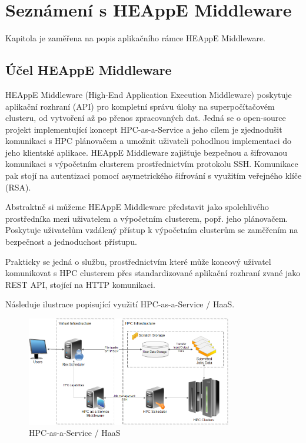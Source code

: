 \chapter{Seznámení s HEAppE Middleware}
Kapitola je zaměřena na popis aplikačního rámce HEAppE Middleware.

\section{Účel HEAppE Middleware}
HEAppE Middleware (High-End Application Execution Middleware) poskytuje aplikační rozhraní (API) pro kompletní správu úlohy na superpočítačovém clusteru, od vytvoření až po přenos zpracovaných dat. Jedná se o open-source projekt implementující koncept HPC-as-a-Service a jeho cílem je zjednodušit komunikaci s HPC plánovačem a umožnit uživateli pohodlnou implementaci do jeho klientské aplikace. HEAppE Middleware zajišťuje bezpečnou a šifrovanou komunikaci s výpočetním clusterem prostřednictvím protokolu SSH. Komunikace pak stojí na autentizaci pomocí asymetrického šifrování s využitím veřejného klíče (RSA).

Abstraktně si můžeme HEAppE Middleware představit jako spolehlivého prostředníka mezi uživatelem a výpočetním clusterem, popř. jeho plánovačem. Poskytuje uživatelům vzdálený přístup k výpočetním clusterům se zaměřením na bezpečnost a jednoduchost přístupu.

Prakticky se jedná o službu, prostřednictvím které může koncový uživatel komunikovat s HPC clusterem přes standardizované aplikační rozhraní zvané jako REST API, stojící na HTTP komunikaci.

Následuje ilustrace popisující využití HPC-as-a-Service / HaaS.

\begin{figure}
	\centering
	\includegraphics[width=0.8\textwidth]{Figures/haas.png}
	\caption{HPC-as-a-Service / HaaS \cite{uG7wIvjQiIli6kO9}}
	\label{fig:haas}
\end{figure}

